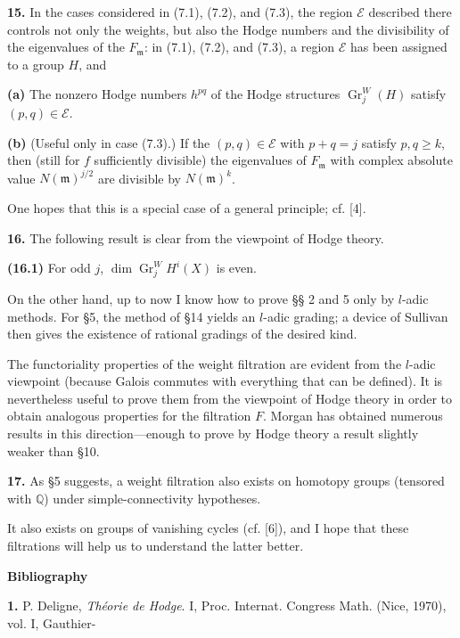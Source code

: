 \documentclass[8pt]{extarticle}
\newcommand{\EndSourcePage}{\clearpage}
\newcommand{\NumPara}[1]{\par\noindent\textbf{#1}\enspace}
\newcommand{\Q}{\mathbb{Q}}
\newcommand{\Gr}{\operatorname{Gr}}
\newcommand{\region}{\mathscr{E}}
\begin{document}
\NumPara{15.} In the cases considered in (7.1), (7.2), and (7.3), the region \(\region\) described there controls not only the weights, but also the Hodge numbers and the divisibility of the eigenvalues of the \(F_{\mathfrak m}\): in (7.1), (7.2), and (7.3), a region \(\region\) has been assigned to a group \(H\), and

\NumPara{(a)} The nonzero Hodge numbers \(h^{pq}\) of the Hodge structures \(\Gr_j^W(H)\) satisfy \((p,q)\in\region\).

\NumPara{(b)} (Useful only in case (7.3).) If the \((p,q)\in\region\) with \(p+q=j\) satisfy \(p,q\ge k\), then (still for \(f\) sufficiently divisible) the eigenvalues of \(F_{\mathfrak m}\) with complex absolute value \(N(\mathfrak m)^{j/2}\) are divisible by \(N(\mathfrak m)^k\).

One hopes that this is a special case of a general principle; cf. [4].

\NumPara{16.} The following result is clear from the viewpoint of Hodge theory.

\NumPara{(16.1)} For odd \(j\), \(\dim\Gr_j^W H^i(X)\) is even.

On the other hand, up to now I know how to prove §§ 2 and 5 only by \(l\)-adic methods. For §5, the method of §14 yields an \(l\)-adic grading; a device of Sullivan then gives the existence of rational gradings of the desired kind.

The functoriality properties of the weight filtration are evident from the \(l\)-adic viewpoint (because Galois commutes with everything that can be defined). It is nevertheless useful to prove them from the viewpoint of Hodge theory in order to obtain analogous properties for the filtration \(F\). Morgan has obtained numerous results in this direction---enough to prove by Hodge theory a result slightly weaker than §10.

\NumPara{17.} As §5 suggests, a weight filtration also exists on homotopy groups (tensored with \(\Q\)) under simple-connectivity hypotheses.

It also exists on groups of vanishing cycles (cf. [6]), and I hope that these filtrations will help us to understand the latter better.

\begin{center}\sffamily\bfseries Bibliography\end{center}

\noindent\textbf{1.} P. Deligne, \emph{Théorie de Hodge}. I, Proc. Internat. Congress Math. (Nice, 1970), vol. I, Gauthier-
\EndSourcePage
\end{document}
